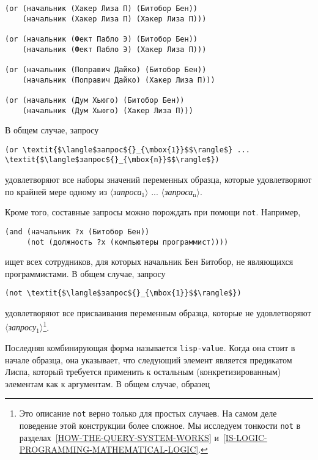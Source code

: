 \begin{Verbatim}[fontsize=\small]
(or (начальник (Хакер Лиза П) (Битобор Бен))
    (начальник (Хакер Лиза П) (Хакер Лиза П)))

(or (начальник (Фект Пабло Э) (Битобор Бен))
    (начальник (Фект Пабло Э) (Хакер Лиза П)))

(or (начальник (Поправич Дайко) (Битобор Бен))
    (начальник (Поправич Дайко) (Хакер Лиза П)))

(or (начальник (Дум Хьюго) (Битобор Бен))
    (начальник (Дум Хьюго) (Хакер Лиза П)))
\end{Verbatim}
В общем случае, запросу

\begin{Verbatim}[fontsize=\small]
(or \textit{$\langle$запрос${}_{\mbox{1}}$$\rangle$} ... \textit{$\langle$запрос${}_{\mbox{n}}$$\rangle$})
\end{Verbatim}
удовлетворяют все наборы значений переменных образца, которые
удовлетворяют по крайней мере одному из
\textit{$\langle$запроса${}_{\mbox{1}}$$\rangle$} ... \textit{$\langle$запроса${}_{\mbox{n}}$$\rangle$}.

Кроме того, составные запросы можно порождать при помощи
{\tt not}.
Например,

\begin{Verbatim}[fontsize=\small]
(and (начальник ?x (Битобор Бен))
     (not (должность ?x (компьютеры программист))))
\end{Verbatim}
ищет всех сотрудников, для которых начальник Бен Битобор, не
являющихся программистами.  В общем случае, запросу

\begin{Verbatim}[fontsize=\small]
(not \textit{$\langle$запрос${}_{\mbox{1}}$$\rangle$})
\end{Verbatim}
удовлетворяют все присваивания переменным образца, которые не
удовлетворяют
\textit{$\langle$за\-просу${}_{\mbox{1}}$$\rangle$}\footnote{Это описание 
{\tt not} верно только для простых случаев.  На самом деле поведение этой 
конструкции более сложное.  Мы исследуем тонкости {\tt not} в 
разделах~\ref{HOW-THE-QUERY-SYSTEM-WORKS} 
и~\ref{IS-LOGIC-PROGRAMMING-MATHEMATICAL-LOGIC}.}.

Последняя комбинирующая форма называется
{\tt lisp-value}.
Когда она стоит в начале образца, она
указывает, что следующий элемент является предикатом Лиспа, который
требуется применить к остальным (конкретизированным) элементам как к
аргументам.  В общем случае, образец

